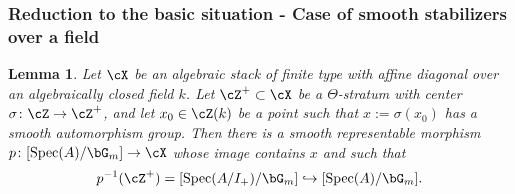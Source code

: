 \documentclass[a4paper]{amsart}
\numberwithin{equation}{section}
\theoremstyle{plain}
\newtheorem{lem}[thm]{Lemma}
\theoremstyle{definition}
\DeclareMathOperator{\Spec}{Spec}
\newcommand{\co}{\colon}
\begin{document}
\subsubsection{Reduction to the basic situation - Case of smooth stabilizers over a field}

\begin{lem} \label{L:stratum_chart_2} 
	Let $\cX$ be an algebraic stack  of finite type with affine diagonal  over an algebraically closed field $k$. 
	Let $\cZ^+\subset \cX$ be a $\Theta$-stratum with center $\sigma \co \cZ \to \cZ^+$, and let $x_0 \in \cZ(k)$ be a point such that $x:=\sigma(x_0)$ has a smooth automorphism group. Then there is a smooth representable morphism $p \co [\Spec(A)/\bG_m] \to \cX$ whose image contains $x$ and such that 
	\[
	 p^{-1}(\cZ^+) = [\Spec(A/I_+) / \bG_m] \hookrightarrow [\Spec(A)/ \bG_m].
	\]
\end{lem}
\end{document}
